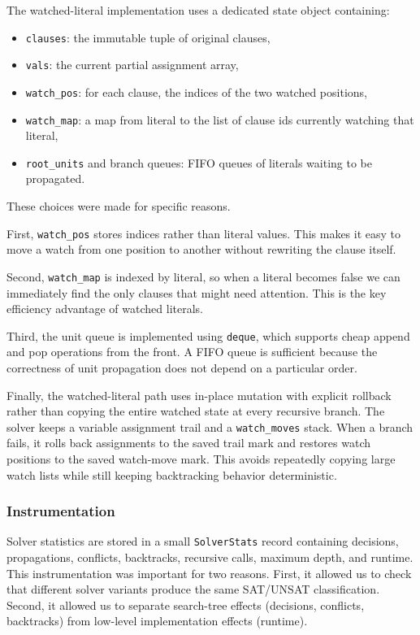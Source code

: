 \documentclass[11pt]{article}
\begin{document}
The watched-literal implementation uses a dedicated state object containing:

\begin{itemize}
    \item \texttt{clauses}: the immutable tuple of original clauses,
    \item \texttt{vals}: the current partial assignment array,
    \item \texttt{watch\_pos}: for each clause, the indices of the two
    watched positions,
    \item \texttt{watch\_map}: a map from literal to the list of clause ids
    currently watching that literal,
    \item \texttt{root\_units} and branch queues: FIFO queues of literals waiting to be
    propagated.
\end{itemize}

These choices were made for specific reasons.

First, \texttt{watch\_pos} stores indices rather than literal values. This
makes it easy to move a watch from one position to another without rewriting the
clause itself.

Second, \texttt{watch\_map} is indexed by literal, so when a literal becomes
false we can immediately find the only clauses that might need attention. This
is the key efficiency advantage of watched literals.

Third, the unit queue is implemented using \texttt{deque}, which supports cheap
append and pop operations from the front. A FIFO queue is sufficient because
the correctness of unit propagation does not depend on a particular order.

Finally, the watched-literal path uses in-place mutation with explicit rollback
rather than copying the entire watched state at every recursive branch. The
solver keeps a variable assignment trail and a \texttt{watch\_moves} stack. When
a branch fails, it rolls back assignments to the saved trail mark and restores
watch positions to the saved watch-move mark. This avoids repeatedly copying
large watch lists while still keeping backtracking behavior deterministic.

\subsubsection{Instrumentation}

Solver statistics are stored in a small \texttt{SolverStats} record containing
decisions, propagations, conflicts, backtracks, recursive calls, maximum depth,
and runtime. This instrumentation was important for two reasons. First, it
allowed us to check that different solver variants produce the same SAT/UNSAT
classification. Second, it allowed us to separate search-tree effects
(decisions, conflicts, backtracks) from low-level implementation effects
(runtime).
\end{document}
